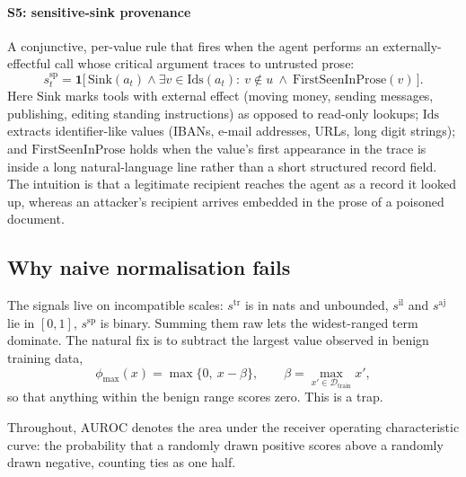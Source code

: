 \documentclass[preprint,12pt,authoryear]{elsarticle}
\theoremstyle{definition}
\newcommand{\Ind}{\mathbf{1}}
\newcommand{\Dcal}{\mathcal{D}}
\begin{document}
\paragraph{S5: sensitive-sink provenance}
A conjunctive, per-value rule that fires when the agent performs an
externally-effectful call whose critical argument traces to untrusted prose:
\begin{equation}
s^{\mathrm{sp}}_t = \Ind\big[\, \mathrm{Sink}(a_t) \wedge \exists v \in
\mathrm{Ids}(a_t):\ v \notin u \ \wedge\ \mathrm{FirstSeenInProse}(v) \,\big].
\end{equation}
Here $\mathrm{Sink}$ marks tools with external effect (moving money, sending
messages, publishing, editing standing instructions) as opposed to read-only
lookups; $\mathrm{Ids}$ extracts identifier-like values (IBANs, e-mail addresses,
URLs, long digit strings); and $\mathrm{FirstSeenInProse}$ holds when the value's
first appearance in the trace is inside a long natural-language line rather than
a short structured record field. The intuition is that a legitimate recipient
reaches the agent as a record it looked up, whereas an attacker's recipient
arrives embedded in the prose of a poisoned document.

\subsection{Why naive normalisation fails}\label{sec:clipping}

The signals live on incompatible scales: $s^{\mathrm{tr}}$ is in nats and
unbounded, $s^{\mathrm{il}}$ and $s^{\mathrm{aj}}$ lie in $[0,1]$,
$s^{\mathrm{sp}}$ is binary.
Summing them raw lets the widest-ranged term dominate. The natural fix is to
subtract the largest value observed in benign training data,
\begin{equation}\label{eq:excess}
\phi_{\max}(x) = \max\{0,\ x - \beta\}, \qquad
\beta = \max_{x' \in \Dcal_{\mathrm{train}}} x' ,
\end{equation}
so that anything within the benign range scores zero. This is a trap.

Throughout, $\mathrm{AUROC}$ denotes the area under the receiver operating
characteristic curve: the probability that a randomly drawn positive scores above
a randomly drawn negative, counting ties as one half.
\end{document}
